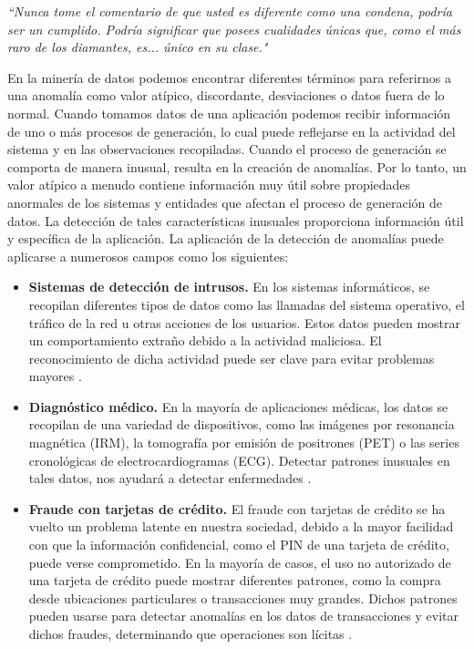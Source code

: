 \textit{
``Nunca tome el comentario de que usted es diferente como una condena,
podría ser un cumplido. Podría significar que posees cualidades únicas
que, como el más raro de los diamantes, es... único en su clase."}

En la minería de datos podemos encontrar diferentes términos para referirnos
a una anomalía como valor atípico, discordante,
desviaciones o datos fuera de lo normal. Cuando tomamos datos de una aplicación
podemos recibir información de uno o más procesos de generación,
lo cual puede reflejarse en la actividad del sistema y en las observaciones recopiladas.
Cuando el proceso de generación se comporta de manera inusual, resulta en la creación de anomalías.
Por lo tanto, un valor atípico a menudo contiene información muy útil sobre propiedades
anormales de los sistemas y entidades que afectan el proceso de generación de datos.
La detección de tales características inusuales proporciona información útil y específica de la aplicación.
La aplicación de la detección de anomalías puede aplicarse a numerosos campos como los siguientes:

\begin{itemize}
    \item \textbf{Sistemas de detección de intrusos.} En los sistemas informáticos, se recopilan diferentes
    tipos de datos como las llamadas del sistema operativo, el tráfico de la red u otras acciones de los usuarios.
    Estos datos pueden mostrar un comportamiento extraño debido a la actividad maliciosa. El reconocimiento de dicha
    actividad puede ser clave para evitar problemas mayores \cite{kumarAnomalyBasedNetworkIntrusion2019}
    \cite{jabezIntrusionDetectionSystem2015}.
    \item \textbf{Diagnóstico médico.} En la mayoría de aplicaciones médicas, los datos se recopilan de una variedad
    de dispositivos, como las imágenes por resonancia magnética (IRM), la tomografía por emisión de positrones (PET)
    o las series cronológicas de electrocardiogramas (ECG). Detectar patrones inusuales en tales datos, nos ayudará a
    detectar enfermedades
    \cite{vIdentificationOutliersMedical2014} \cite{gasparSystematicReviewOutliers2011}.
    \item \textbf{Fraude con tarjetas de crédito.} El fraude con tarjetas de crédito se ha vuelto un problema latente
    en nuestra sociedad, debido a la mayor facilidad con que la información confidencial, como el PIN de una tarjeta de crédito,
    puede verse comprometido. En la mayoría de casos, el uso no autorizado de una tarjeta de crédito puede mostrar diferentes patrones,
    como la compra desde ubicaciones particulares o transacciones muy grandes. Dichos patrones pueden usarse para detectar
    anomalías en los datos de transacciones y evitar dichos fraudes, determinando que operaciones son lícitas
    \cite{porwalCreditCardFraud2018} \cite{amrutad.pawarSurveyOutlierDetection2014}.
\end{itemize}

